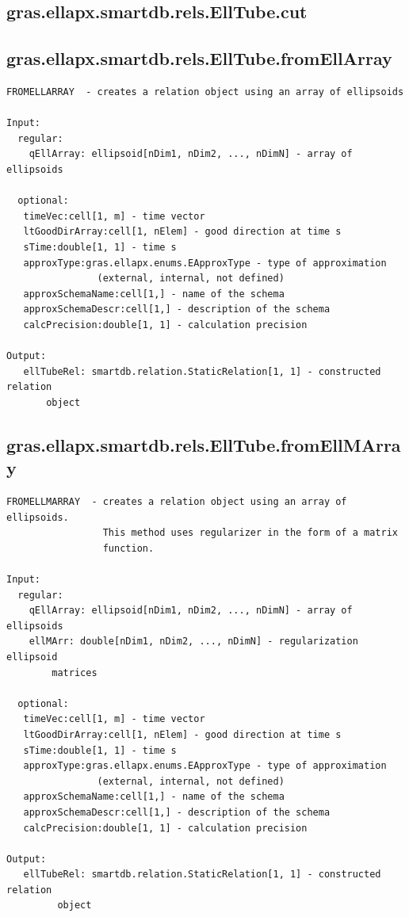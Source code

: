 \documentclass[letterpaper,10pt,english]{sphinxmanual}
\begin{document}
\subsection{gras.ellapx.smartdb.rels.EllTube.cut}
\label{chap_functions:gras-ellapx-smartdb-rels-elltube-cut}

\subsection{gras.ellapx.smartdb.rels.EllTube.fromEllArray}
\label{chap_functions:gras-ellapx-smartdb-rels-elltube-fromellarray}
\begin{Verbatim}[commandchars=\\\{\}]
FROMELLARRAY  - creates a relation object using an array of ellipsoids

Input:
  regular:
    qEllArray: ellipsoid[nDim1, nDim2, ..., nDimN] - array of ellipsoids

  optional:
   timeVec:cell[1, m] - time vector
   ltGoodDirArray:cell[1, nElem] - good direction at time s
   sTime:double[1, 1] - time s
   approxType:gras.ellapx.enums.EApproxType - type of approximation
                (external, internal, not defined)
   approxSchemaName:cell[1,] - name of the schema
   approxSchemaDescr:cell[1,] - description of the schema
   calcPrecision:double[1, 1] - calculation precision

Output:
   ellTubeRel: smartdb.relation.StaticRelation[1, 1] - constructed relation
       object
\end{Verbatim}


\subsection{gras.ellapx.smartdb.rels.EllTube.fromEllMArray}
\label{chap_functions:gras-ellapx-smartdb-rels-elltube-fromellmarray}
\begin{Verbatim}[commandchars=\\\{\}]
FROMELLMARRAY  - creates a relation object using an array of ellipsoids.
                 This method uses regularizer in the form of a matrix
                 function.

Input:
  regular:
    qEllArray: ellipsoid[nDim1, nDim2, ..., nDimN] - array of ellipsoids
    ellMArr: double[nDim1, nDim2, ..., nDimN] - regularization ellipsoid
        matrices

  optional:
   timeVec:cell[1, m] - time vector
   ltGoodDirArray:cell[1, nElem] - good direction at time s
   sTime:double[1, 1] - time s
   approxType:gras.ellapx.enums.EApproxType - type of approximation
                (external, internal, not defined)
   approxSchemaName:cell[1,] - name of the schema
   approxSchemaDescr:cell[1,] - description of the schema
   calcPrecision:double[1, 1] - calculation precision

Output:
   ellTubeRel: smartdb.relation.StaticRelation[1, 1] - constructed relation
         object
\end{Verbatim}
\end{document}
